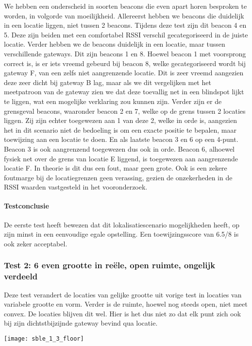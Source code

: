 We hebben een onderscheid in soorten beacons die even apart horen besproken te worden, in volgorde van moeilijkheid. Allereerst hebben we beacons die duidelijk in een locatie liggen, niet tussen 2 beacons. Tijdens deze test zijn dit beacon 4 en 5. Deze zijn beiden met een comfortabel RSSI verschil gecategoriseerd in de juiste locatie. Verder hebben we de beacons duidelijk in een locatie, maar tussen verschillende gateways. Dit zijn beacons 1 en 8. Hoewel beacon 1 met voorsprong correct is, is er iets vreemd gebeurd bij beacon 8, welke gecategoriseerd wordt bij gateway F, van een zelfs niet aangrenzende locatie.  Dit is zeer vreemd aangezien deze zeer dicht bij gateway B lag, maar als we dit vergelijken met het meetpatroon van de gateway zien we dat deze toevallig net in een blindspot lijkt te liggen, wat een mogelijke verklaring zou kunnen zijn. Verder zijn er de grensgeval beacons, waaronder beacon 2 en 7, welke op de grens tussen 2 locaties liggen. Zij zijn echter toegewezen aan 1 van deze 2, welke in orde is, aangezien het in dit scenario niet de bedoeling is om een exacte positie te bepalen, maar toewijzing aan een locatie te doen. En als laatste beacon 3 en 6 op een 4-punt. Beacon 3 is ook aangrenzend toegewezen dus ook in orde. Beacon 6, alhoewel fysiek net over de grens van locatie E liggend, is toegewezen aan aangrenzende locatie F. In theorie is dit dus een fout, maar geen grote. Ook is een zekere foutmarge bij de locatiegrenzen geen verassing, gezien de onzekerheden in de RSSI waarden vastgesteld in het vooronderzoek.

\paragraph{Testconclusie}
De eerste test heeft bewezen dat dit lokalisatiescenario mogelijkheden heeft, op zijn minst in een eenvoudige egale opstelling. Een toewijzingsscore van 6.5/8 is ook zeker acceptabel.

\subsubsection{Test 2: 6 even grootte in reële, open ruimte, ongelijk verdeeld}
\begin{minipage}{0.55\textwidth}
Deze test verandert de locaties van gelijke grootte uit vorige test in locaties van variabele grootte en vorm. Verder is de ruimte, hoewel nog steeds open, niet meet convex. De locaties blijven dit wel. Hier is het dus niet zo dat elk punt zich ook bij zijn dichtstbijzijnde gateway bevind qua locatie.
\end{minipage}
\hfill
\begin{minipage}{0.42\textwidth}
	\texttt{[image: sble\_1\_3\_floor]}
	\label{fig:ond-ble-static-1-3-ops}
\end{minipage}


